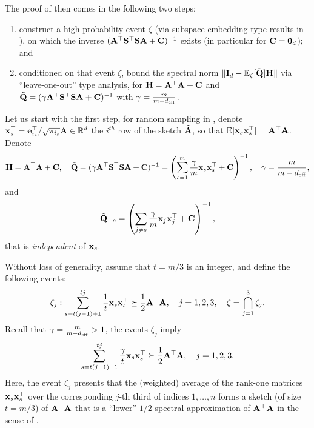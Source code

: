 \documentclass[11pt,a4paper]{article}
\begin{document}
The proof of  then comes in the following two steps:
\begin{enumerate}
  \item construct a high probability event $\zeta$ (via subspace embedding-type results in ), on which the inverse $(\mathbf{A}^\top \mathbf{S}^\top \mathbf{S} \mathbf{A} + \mathbf{C})^{-1}$ exists (in particular for $\mathbf{C} = \mathbf{0}_d$); and
  \item conditioned on that event $\zeta$, bound the spectral norm $ \| \mathbf{I}_d-{\mathbb{E}}_{\zeta} [\tilde{\mathbf{Q}}]\mathbf{H} \|$ via ``leave-one-out'' type analysis, for $\mathbf{H}=\mathbf{A}^\top\mathbf{A}+\mathbf{C}$ and $\tilde{\mathbf{Q}}=(\gamma\mathbf{A}^\top \mathbf{S}^\top\mathbf{S} \mathbf{A} +\mathbf{C})^{-1}$ with $\gamma=\frac{m}{m-d_{\mathrm{eff}}}$.
\end{enumerate}


Let us start with the first step, for random sampling in , denote $\mathbf{x}^\top_s=\mathbf{e}^\top_{i_s}/\sqrt{\pi_{i_s}}\mathbf{A} \in {\mathbb{R}}^d$ the $i^{th}$ row of the sketch $\tilde {\mathbf{A}}$, so that ${\mathbb{E}}[\mathbf{x}_s{\mathbf{x}}^{\top}_s]=\mathbf{A}^\top\mathbf{A}$.
Denote
\begin{equation}\label{eq:def_H_Q_proof_prop:coarse-RS}
  \mathbf{H}=\mathbf{A}^\top\mathbf{A}+\mathbf{C}, \quad \tilde{\mathbf{Q}}=(\gamma\mathbf{A}^\top \mathbf{S}^\top\mathbf{S} \mathbf{A} +\mathbf{C})^{-1}= \left(\sum^{m}_{s=1}\frac{\gamma}{m}\mathbf{x}_s{\mathbf{x}}^{\top}_s+\mathbf{C} \right)^{-1}, \quad \gamma=\frac{m}{m-d_{\mathrm{eff}}},
\end{equation}
and
\begin{equation*}
  \tilde{\mathbf{Q}}_{-s}= \left(\sum_{j\neq s}\frac{\gamma}{m}\mathbf{x}_j{\mathbf{x}}^{\top}_j +\mathbf{C} \right)^{-1},
\end{equation*} 
that is \emph{independent} of $\mathbf{x}_s$.


Without loss of generality, assume that $t=m/3$ is an integer, and define the following events:
\begin{align}\label{eq:events}
    \zeta_j:\sum^{tj}_{s=t(j-1)+1}\frac{1}{t}\mathbf{x}_s{\mathbf{x}}^{\top}_s\succeq \frac{1}{2}   \mathbf{A}^\top\mathbf{A} ,~~~j=1,2,3,~~~ \zeta=\bigcap^3_{j=1}\zeta_j.
\end{align}
Recall that $\gamma=\frac{m}{m-d_{\mathrm{eff}}} > 1$, the events $\zeta_j$ imply
\begin{align}
 \sum^{tj}_{s=t(j-1)+1}\frac{\gamma}{t}\mathbf{x}_s{\mathbf{x}}^{\top}_s   \succeq \frac{1}{2}   \mathbf{A}^\top\mathbf{A}, ~~~j=1,2,3.\nonumber
\end{align}
Here, the event $\zeta_j$ presents that the (weighted) average of the rank-one matrices $\mathbf{x}_s\mathbf{x}_s^\top$ over the corresponding $j$-th third of indices $1,\ldots,n$ forms a sketch (of size $t = m/3$) of $\mathbf{A}^\top \mathbf{A}$ that is a ``lower'' $1/2$-spectral-approximation of $\mathbf{A}^\top\mathbf{A}$ in the sense of .
\end{document}
